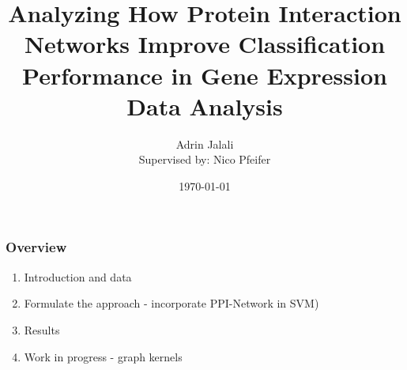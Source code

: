 \documentclass{beamer}
\begin{document}
\title[Gene Expression, PPI Network, Classification]{Analyzing How Protein Interaction Networks Improve Classification Performance in Gene Expression Data Analysis}
\author[Adrin Jalali]{Adrin Jalali \\ \small{Supervised by: Nico Pfeifer}}
\date{\today} 

\begin{frame}
\titlepage
\end{frame}

\begin{frame}
  \frametitle{Overview}
  \begin{enumerate}
  \item Introduction and data
  \item Formulate the approach - incorporate PPI-Network in SVM)
  \item Results
  \item Work in progress - graph kernels
  \end{enumerate}
\end{frame}
\end{document}
